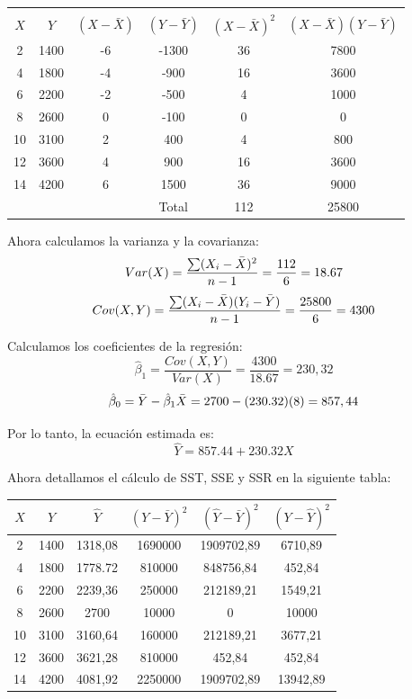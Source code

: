 \documentclass[10pt,a4paper]{article}
\begin{document}
\begin{center}
\begin{tabular}{|c|c|c|c|c|c|}
\hline
& & & & & \\
$X$ & $Y$ & $(X - \bar{X})$ & $(Y - \bar{Y})$ & $(X - \bar{X})^2$ & $(X - \bar{X})(Y - \bar{Y})$ \\
\hline
2   & 1400  & -6  & -1300  & 36   & 7800  \\
\hline
4   & 1800  & -4  & -900   & 16   & 3600  \\
\hline
6   & 2200  & -2  & -500   & 4    & 1000  \\
\hline
8   & 2600  & 0   & -100   & 0    & 0     \\
\hline
10  & 3100  & 2   & 400    & 4    & 800   \\
\hline
12  & 3600  & 4   & 900    & 16   & 3600  \\
\hline
14  & 4200  & 6   & 1500   & 36   & 9000  \\
\hline
 & & & Total & 112 & 25800 \\
 \hline
\end{tabular}
\end{center}

Ahora calculamos la varianza y la covarianza:
$$Var(X) = \frac{\sum (X_i -\Bar{X})^2}{n-1} = \frac{112}{6} = 18.67$$
$$Cov(X,Y) = \frac{\sum (X_i  - \Bar{X})(Y_i - \Bar{Y})}{n-1} = \frac{25800}{6} = 4300$$

Calculamos los coeficientes de la regresión:
$$\hat{\beta}_1 = \frac{Cov(X,Y)}{Var(X)} = \frac{4300}{18.67} = 230,32$$
$$\hat{\beta}_0 = \Bar{Y}-\hat{\beta}_1 \Bar{X} = 2700-(230.32)(8)=857,44$$

Por lo tanto, la ecuación estimada es:
$$\hat{Y} = 857.44 + 230.32 X$$

Ahora detallamos el cálculo de SST, SSE y SSR en la siguiente tabla:

\begin{center}
\begin{tabular}{|c|c|c|c|c|c|}
\hline
$X$ & $Y$ & $\hat{Y}$ & $(Y - \bar{Y})^2$ & $(\hat{Y} - \bar{Y})^2$ & $(Y - \hat{Y})^2$ \\
\hline
2   & 1400  & 1318,08  & 1690000  & 1909702,89  & 6710,89  \\
\hline
4   & 1800  & 1778.72  & 810000   & 848756,84   & 452,84  \\
\hline
6   & 2200  & 2239,36  & 250000   & 212189,21   & 1549,21  \\
\hline
8   & 2600  & 2700 & 10000    & 0        & 10000  \\
\hline
10  & 3100  & 3160,64  & 160000   & 212189,21   & 3677,21  \\
\hline
12  & 3600  & 3621,28  & 810000   & 452,84   & 452,84  \\
\hline
14  & 4200  & 4081,92  & 2250000  & 1909702,89  & 13942,89  \\
\hline
\end{tabular}
\end{center}
\end{document}
